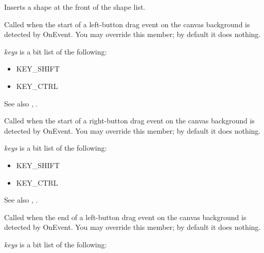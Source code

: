 Inserts a shape at the front of the shape list.

\label{wxshapecanvasonbegindragleft}


Called when the start of a left-button drag event on the canvas background is detected by OnEvent. You may override this member;
by default it does nothing.

{\it keys} is a bit list of the following:

\begin{itemize}\itemsep=0pt
\item KEY\_SHIFT
\item KEY\_CTRL
\end{itemize}

See also , .

\label{wxshapecanvasonbegindragright}


Called when the start of a right-button drag event on the canvas background is detected by OnEvent. You may override this member;
by default it does nothing.

{\it keys} is a bit list of the following:

\begin{itemize}\itemsep=0pt
\item KEY\_SHIFT
\item KEY\_CTRL
\end{itemize}

See also , .

\label{wxshapecanvasonenddragleft}


Called when the end of a left-button drag event on the canvas background is detected by OnEvent. You may override this member;
by default it does nothing.

{\it keys} is a bit list of the following:

